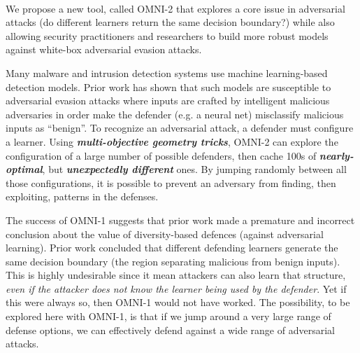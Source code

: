 


\begin{nsfsummary} 
\begin{center}
{\bf \TITLE}\\\vspace{1mm}
 \end{center}
  
\noindent


We propose a new tool, called \mbox{OMNI-2} that explores a core issue in adversarial attacks
(do different learners return the same decision boundary?)
while also allowing security practitioners and researchers to build more robust models against  white-box   adversarial evasion attacks.

 Many  malware and intrusion detection systems use machine learning-based   detection models. Prior work has shown that such models are susceptible to adversarial evasion attacks where inputs are    crafted by intelligent malicious adversaries  in order make the defender
(e.g. a neural net) misclassify malicious inputs as ``benign''. 
To recognize an adversarial attack,
 a defender must configure a  
learner.  
Using   {\bf {\em multi-objective geometry tricks}}, OMNI-2 can  explore the configuration of a large number of possible    defenders, then cache
100s of {\bf {\em nearly-optimal}}, but {\bf {\em unexpectedly different}}
ones.
By jumping randomly between all those configurations, it is possible to   prevent an adversary from finding,
then exploiting,
patterns in the defenses.
 


The  success of   OMNI-1   suggests that  prior work made a premature and 
 incorrect conclusion about the value of diversity-based defences (against adversarial learning).  
  Prior work   concluded
    that    different  defending
  learners generate the  same decision boundary
  (the region separating malicious from benign inputs). This is highly
  undesirable since it  mean
   attackers can also learn that structure, {\em even if the attacker does not know
  the learner being used by the defender}.  Yet if this were always so, then OMNI-1 
  would not have worked.  The possibility, to be explored here with OMNI-1, is that  if we jump around a very large range of defense options, we can effectively defend against a wide range of adversarial attacks. 
 




\end{nsfsummary}
